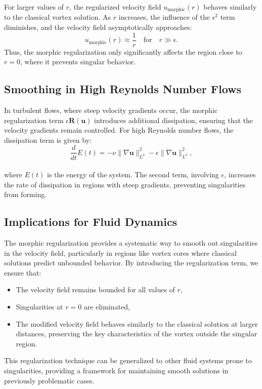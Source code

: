 \documentclass{article}
\begin{document}
For larger values of \( r \), the regularized velocity field \( u_{\text{morphic}}(r) \) behaves similarly to the classical vortex solution. As \( r \) increases, the influence of the \( \epsilon^2 \) term diminishes, and the velocity field asymptotically approaches:
\[
u_{\text{morphic}}(r) \approx \frac{1}{r} \quad \text{for} \quad r \gg \epsilon.
\]
Thus, the morphic regularization only significantly affects the region close to \( r = 0 \), where it prevents singular behavior.
\\

\subsection*{Smoothing in High Reynolds Number Flows}

In turbulent flows, where steep velocity gradients occur, the morphic regularization term \( \epsilon \mathbf{R}(\mathbf{u}) \) introduces additional dissipation, ensuring that the velocity gradients remain controlled. For high Reynolds number flows, the dissipation term is given by:
\[
\frac{d}{dt} E(t) = - \nu \|\nabla \mathbf{u}\|_{L^2}^2 - \epsilon \|\nabla \mathbf{u}\|_{L^2}^2,
\]
\\
where \( E(t) \) is the energy of the system. The second term, involving \( \epsilon \), increases the rate of dissipation in regions with steep gradients, preventing singularities from forming.


\subsection*{Implications for Fluid Dynamics}

The morphic regularization provides a systematic way to smooth out singularities in the velocity field, particularly in regions like vortex cores where classical solutions predict unbounded behavior. By introducing the regularization term, we ensure that:
\begin{itemize}
    \item The velocity field remains bounded for all values of \( r \),
    \item Singularities at \( r = 0 \) are eliminated,
    \item The modified velocity field behaves similarly to the classical solution at larger distances, preserving the key characteristics of the vortex outside the singular region.
\end{itemize}

This regularization technique can be generalized to other fluid systems prone to singularities, providing a framework for maintaining smooth solutions in previously problematic cases.
\end{document}
